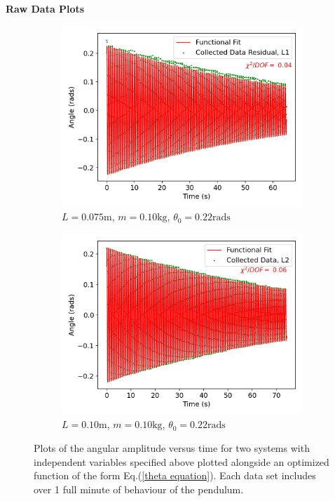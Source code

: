 
\large{\textbf{Raw Data Plots}}\normalsize\\[0.20cm]

\begin{figure}[H]
\centering
\begin{subfigure}[t]{0.5\textwidth}
  \centering
  \includegraphics[width=1\textwidth]{Plots/L1.png}
  \caption{\small{$L = 0.075\text{m}$, $m = 0.10\text{kg}$, $\theta_0 = 0.22\text{rads}$}}
  \label{L1}
\end{subfigure}%
\begin{subfigure}[t]{.5\textwidth}
  \centering
  \includegraphics[width=\textwidth]{Plots/L2.png}
  \caption{\small{$L = 0.10\text{m}$, $m = 0.10\text{kg}$, $\theta_0 = 0.22\text{rads}$}}
  \label{L2}
\end{subfigure}
\caption{\small{Plots of the angular amplitude versus time for two systems with independent variables specified above plotted alongside an optimized function of the form Eq.(\ref{theta equation}). Each data set includes over 1 full minute of behaviour of the pendulum.}}
\end{figure}


